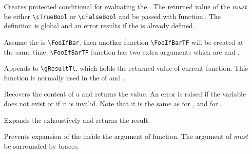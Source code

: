 \documentclass[oneside]{book}
\let\tn=\cs
\begin{document}
\begin{function}{\PrgNewConditional}
\begin{syntax}
   
\end{syntax}
Creates protected conditional  for evaluating the .
The returned value of the  \emph{must} be either \verb!\cTrueBool!
or \verb!\cFalseBool! and be passed with  function..
The definition is global and an error results if the  is already defined.
\par
Assume the  is \verb!\FooIfBar!, then another function \verb!\FooIfBarTF!
will be created at the same time. \verb!\FooIfBarTF! function has two extra arguments
which are  and .\par
\end{function}

\begin{function}{\Result}
\begin{syntax}
 
\end{syntax}
Appends  to \verb!\gResultTl!, which holds the returned value of current function.
This function is normally used in the  of  and .
\end{function}

\begin{function}{\Value}
\begin{syntax}
 
\end{syntax}
Recovers the content of a  and returns the value.
An error is raised if the variable does not exist or if it is invalid.
Note that it is the same as  for , and  for .
\end{function}

\begin{function}{\Expand}
\begin{syntax}
 
\end{syntax}
Expands the  exhaustively and returns the result.
\end{function}

\begin{function}{\ExpNot}
\begin{syntax}
 
\end{syntax}
Prevents expansion of the  inside the argument of  function.
The argument of  \emph{must} be surrounded by braces.
\end{function}
\end{document}
